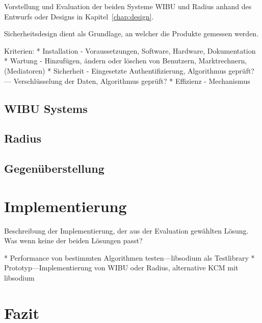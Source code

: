 \documentclass[11pt,a4paper]{report}
\begin{document}
Vorstellung und Evaluation der beiden Systeme WIBU und Radius anhand des Entwurfs oder Designs in Kapitel~\ref{chap:design}.

Sicherheitsdesign dient als Grundlage, an welcher die Produkte gemessen werden.

Kriterien:
* Installation - Voraussetzungen, Software, Hardware, Dokumentation
* Wartung - Hinzufügen, ändern oder löschen von Benutzern, Marktrechnern, (Mediatoren)
* Sicherheit - Eingesetzte Authentifizierung, Algorithmus geprüft? --- Verschlüsselung der Daten, Algorithmus geprüft?
* Effizienz - Mechanismus 
                                            
\section{WIBU Systems}

\section{Radius}

\section{Gegenüberstellung}

\chapter{Implementierung} \label{chap:implementation}

Beschreibung der Implementierung, der aus der Evaluation gewählten Lösung. Was wenn keine der beiden Lösungen passt?

* Performance von bestimmten Algorithmen testen---libsodium als Testlibrary 
* Prototyp---Implementierung von WIBU oder Radius, alternative KCM mit libsodium

\chapter{Fazit}
\end{document}
